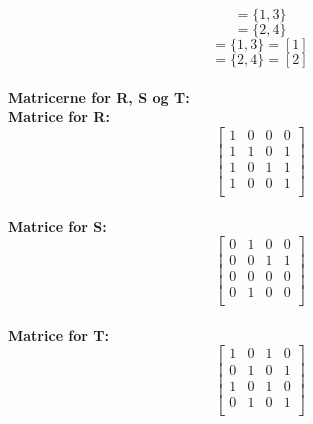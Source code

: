 \documentclass{article}
\begin{document}
\begin{displaymath}
[1] = \lbrace 1, 3 \rbrace
\end{displaymath}
\begin{displaymath}
[2] = \lbrace 2, 4 \rbrace
\end{displaymath}
\begin{displaymath}
[3] = \lbrace 1, 3 \rbrace = [1]
\end{displaymath}
\begin{displaymath}
[4] = \lbrace 2, 4 \rbrace = [2]
\end{displaymath}
\\
\textbf{Matricerne for R, S og T:}
\\
\textbf{Matrice for R:}
\begin{displaymath}
\begin{bmatrix}
1 & 0 & 0 & 0\\
1 & 1 & 0 & 1\\
1 & 0 & 1 & 1\\
1 & 0 & 0 & 1\\
\end{bmatrix}
\end{displaymath}
\\
\textbf{Matrice for S:}
\begin{displaymath}
\begin{bmatrix}
0 & 1 & 0 & 0\\
0 & 0 & 1 & 1\\
0 & 0 & 0 & 0\\
0 & 1 & 0 & 0\\
\end{bmatrix}
\end{displaymath}\\
\textbf{Matrice for T:}
\begin{displaymath}
\begin{bmatrix}
1 & 0 & 1 & 0\\
0 & 1 & 0 & 1\\
1 & 0 & 1 & 0\\
0 & 1 & 0 & 1\\
\end{bmatrix}
\end{displaymath}
\end{document}
